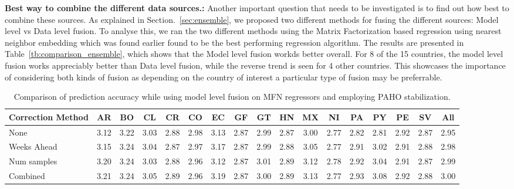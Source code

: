 {\noindent \textbf{Best way to combine the different data sources.: }} Another important 
question that needs to be investigated is to find out how best to combine these sources. 
As explained in Section.~\ref{sec:ensemble}, we proposed two different methods for fusing the
different sources: Model level vs Data level fusion. To analyse this, we ran the two different methods
using the Matrix Factorization based regression using nearest neighbor embedding which was found earlier 
found to be the best performing regression algorithm. The results are presented in Table~\ref{tb:comparison_ensemble}, 
which shows that the Model level fusion workds better overall. For 8 of the 15 countries, the model level fusion works
appreciably better than Data level fusion, while the reverse trend is seen for 4 other countries. 
This showcases the importance of considering both kinds of fusion as depending on the country of interest 
a particular type of fusion may be preferrable.

\begin{table}[tb!]
  \centering
  \caption{\label{tb:moving} Comparison of prediction accuracy while using model level fusion 
  on MFN regressors and employing PAHO stabilization.}
\vspace{1em}
\begin{tabular}{|p{1.5cm}|*{16}{c|}}
\hline
Correction Method& AR & BO & CL & CR & CO & EC & GF & GT & HN & MX & NI & PA & PY & PE & SV & All\\
\hline \hline
None             &3.12&3.22&3.03&2.88&2.98&3.13&2.87&2.99&2.87&3.00&2.77&2.82&2.81&2.92&2.87&2.95\\ \hline
Weeks Ahead      &3.15&3.24&3.04&2.87&2.97&3.17&2.87&2.99&2.88&3.05&2.77&2.91&3.02&2.91&2.88&2.98\\ \hline 
Num samples      &3.20&3.24&3.03&2.88&2.96&3.12&2.87&3.01&2.89&3.12&2.78&2.92&3.04&2.91&2.87&2.99\\ \hline
Combined         &3.21&3.24&3.05&2.89&2.96&3.19&2.87&3.00&2.89&3.13&2.77&2.93&3.08&2.92&2.88&3.00\\ 
\hline
\end{tabular}
\end{table}


